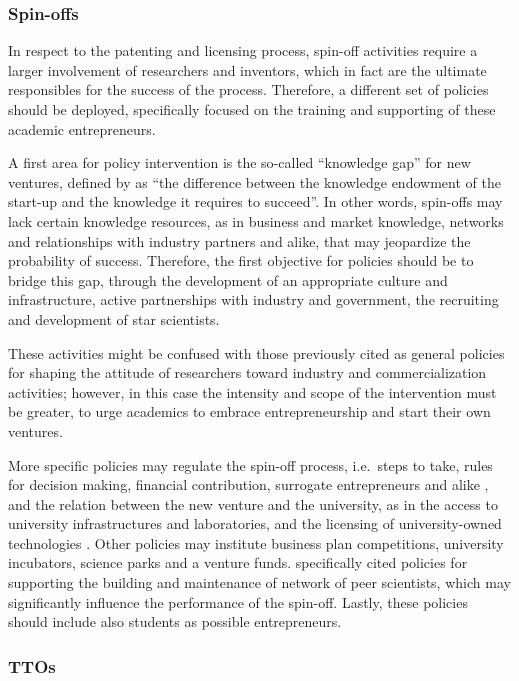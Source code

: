 \subsubsection{Spin-offs}

In respect to the patenting and licensing process, spin-off activities require a larger involvement of researchers and inventors, which in fact are the ultimate responsibles for the success of the process. Therefore, a different set of policies should be deployed, specifically focused on the training and supporting of these academic entrepreneurs.

A first area for policy intervention is the so-called \enquote{knowledge gap} for new ventures, defined by \citet{Lockett2005a} as \enquote{the difference between the knowledge endowment of the start-up and the knowledge it requires to succeed}. In other words, spin-offs may lack certain knowledge resources, as in business and market knowledge, networks and relationships with industry partners and alike, that may jeopardize the probability of success. Therefore, the first objective for policies should be to bridge this gap, through the development of an appropriate culture and infrastructure, active partnerships with industry and government, the recruiting and development of star scientists. 

These activities might be confused with those previously cited as general policies for shaping the attitude of researchers toward industry and commercialization activities; however, in this case the intensity and scope of the intervention must be greater, to urge academics to embrace entrepreneurship and start their own ventures.

More specific policies may regulate the spin-off process, i.e.\ steps to take, rules for decision making, financial contribution, surrogate entrepreneurs and alike \citep{Franklin2001}, and the relation between the new venture and the university, as in the access to university infrastructures and laboratories, and the licensing of university-owned technologies \citep{Fini2009}. Other policies may institute business plan competitions, university incubators, science parks and a venture funds. \citet{Siegel2007} specifically cited policies for supporting the building and maintenance of network of peer scientists, which may significantly influence the performance of the spin-off. Lastly, these policies should include also students as possible entrepreneurs. 

\subsubsection{TTOs}

